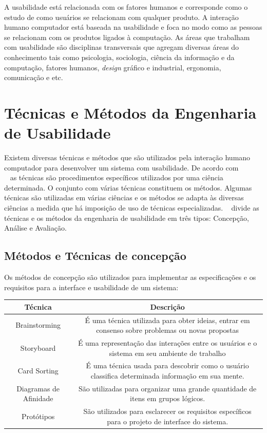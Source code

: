 A usabilidade está relacionada com os fatores humanos e corresponde como o estudo de como usuários se relacionam com qualquer produto. A interação humano computador está baseada na usabilidade e foca no modo como as pessoas se relacionam com os produtos ligados à computação.
%
As áreas que trabalham com usabilidade são disciplinas transversais que agregam diversas áreas do conhecimento tais como psicologia, sociologia, ciência da informação e da computação, fatores humanos, \emph{design} gráfico e industrial, ergonomia, comunicação e etc.
%


\section{Técnicas e Métodos da Engenharia de Usabilidade}


Existem diversas técnicas e métodos que são utilizados pela interação humano computador para desenvolver um sistema com usabilidade.
%
De acordo com \\ ~ as técnicas são procedimentos específicos utilizados por uma ciência determinada. O conjunto com várias técnicas constituem os métodos. Algumas técnicas são utilizadas em várias ciências e os métodos se adapta às diversas ciências a medida que há imposição de uso de técnicas especializadas.
%
~ divide as técnicas e os métodos da engenharia de usabilidade em três tipos: Concepção, Análise e Avaliação.

\subsection{Métodos e Técnicas de concepção}

Os métodos de concepção são utilizados para implementar as especificações e os requisitos para a interface e usabilidade de um sistema:

\begin{tabular}{|c|c|}
\hline 
Técnica & Descrição \\ 
\hline 
Brainstorming & É uma técnica utilizada para obter ideias, entrar em consenso sobre problemas ou novas propostas \\ 
\hline 
Storyboard & É uma representação das interações entre os usuários e o sistema em seu ambiente de trabalho \\ 
\hline 
Card Sorting & É uma técnica usada para descobrir como o usuário classifica determinada informação em sua mente. \\ 
\hline 
Diagramas de Afinidade & São utilizadas para organizar uma grande quantidade de itens em grupos lógicos. \\ 
\hline 
Protótipos & São utilizados para esclarecer os requisitos específicos para o projeto de interface do sistema. \\ 
\hline 
\end{tabular} 

